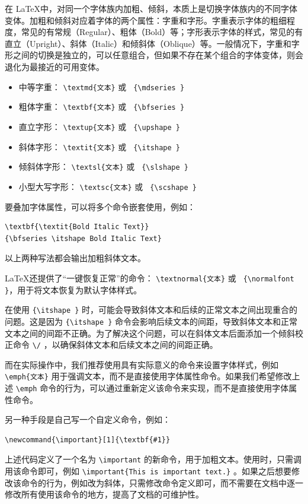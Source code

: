 在 \LaTeX 中，对同一个字体族内加粗、倾斜，本质上是切换字体族内的不同字体变体。加粗和倾斜对应着字体的两个属性：字重和字形。字重表示字体的粗细程度，常见的有常规（Regular）、粗体（Bold）等；字形表示字体的样式，常见的有直立（Upright）、斜体（Italic）和倾斜体（Oblique）等。一般情况下，字重和字形之间的切换是独立的，可以任意组合，但如果不存在某个组合的字体变体，则会退化为最接近的可用变体。

\begin{itemize}
  \item 中等字重： \verb|\textmd{文本}| 或 \verb| {\mdseries }|
  \item 粗体字重： \verb|\textbf{文本}| 或 \verb| {\bfseries }|
  \item 直立字形： \verb|\textup{文本}| 或 \verb| {\upshape }|
  \item 斜体字形： \verb|\textit{文本}| 或 \verb| {\itshape }|
  \item 倾斜体字形： \verb|\textsl{文本}| 或 \verb| {\slshape }|
  \item 小型大写字形： \verb|\textsc{文本}| 或 \verb| {\scshape }|
\end{itemize}

要叠加字体属性，可以将多个命令嵌套使用，例如：
\begin{verbatim}
\textbf{\textit{Bold Italic Text}}
{\bfseries \itshape Bold Italic Text}
\end{verbatim}
以上两种写法都会输出加粗斜体文本。

\LaTeX 还提供了“一键恢复正常”的命令： \verb|\textnormal{文本}| 或 \verb| {\normalfont }|，用于将文本恢复为默认字体样式。

\begin{tip}
  在使用 \verb|{\itshape }| 时，可能会导致斜体文本和后续的正常文本之间出现重合的问题。这是因为 \verb|{\itshape }| 命令会影响后续文本的间距，导致斜体文本和正常文本之间的间距不正确。为了解决这个问题，可以在斜体文本后面添加一个倾斜校正命令 \verb|\/| ，以确保斜体文本和后续文本之间的间距正确。
\end{tip}

而在实际操作中，我们推荐使用具有实际意义的命令来设置字体样式，例如 \verb|\emph{文本}| 用于强调文本，而不是直接使用字体属性命令。如果我们希望修改上述 \verb|\emph| 命令的行为，可以通过重新定义该命令来实现，而不是直接使用字体属性命令。

另一种手段是自己写一个自定义命令，例如：
\begin{verbatim}
\newcommand{\important}[1]{\textbf{#1}}
\end{verbatim}
上述代码定义了一个名为 \verb|\important| 的新命令，用于加粗文本。使用时，只需调用该命令即可，例如 \verb|\important{This is important text.}| 。如果之后想要修改该命令的行为，例如改为斜体，只需修改命令定义即可，而不需要在文档中逐一修改所有使用该命令的地方，提高了文档的可维护性。

